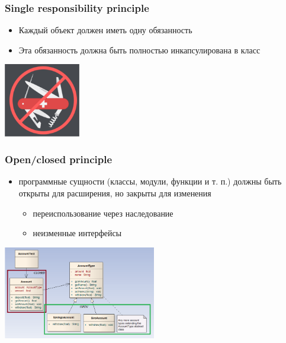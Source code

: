 \documentclass[xetex,mathserif,serif]{beamer}
\begin{document}
	\begin{frame}
		\frametitle{Single responsibility principle}
		\begin{itemize}
			\item Каждый объект должен иметь одну обязанность
			\item Эта обязанность должна быть полностью инкапсулирована в класс
		\end{itemize}
		\begin{flushright}
			\includegraphics[width=0.25\textwidth]{singleResponsibility.png}
		\end{flushright}
	\end{frame}

	\begin{frame}
		\frametitle{Open/closed principle}
		\begin{itemize}
			\item программные сущности (классы, модули, функции и т. п.) должны быть открыты для расширения, но закрыты для изменения
			\begin{itemize}
				\item переиспользование через наследование
				\item неизменные интерфейсы
			\end{itemize}
		\end{itemize}
		\begin{flushright}
			\includegraphics[width=0.5\textwidth]{openClosedPrinciple.png}
		\end{flushright}
	\end{frame}
\end{document}
